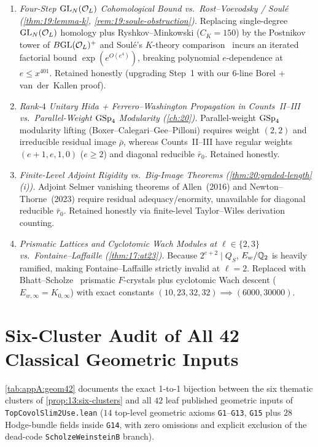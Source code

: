\begin{enumerate}[label=\textbf{F\arabic*.}]
\item \emph{Four-Step $\mathrm{GL}_N(\mathcal{O}_L)$ Cohomological Bound vs.\ Rost--Voevodsky / Soul\'e (\cref{thm:19:lemma-k}, \cref{rem:19:soule-obstruction}).}
  Replacing single-degree $\mathrm{GL}_N(\mathcal{O}_L)$ homology plus Ryshkov--Minkowski ($C_K = 150$) by the Postnikov tower of $B\mathrm{GL}(\mathcal{O}_L)^+$ and Soul\'e's $K$-theory comparison~\cite{Soule1999} incurs an iterated factorial bound $\exp(e^{O(e^4)})$, breaking polynomial $e$-dependence at $e \le x^{401}$. Retained honestly (upgrading Step~1 with our 6-line Borel + van~der~Kallen proof).

\item \emph{Rank-$4$ Unitary Hida + Ferrero--Washington Propagation in Counts~II--III vs.\ Parallel-Weight $\mathrm{GSp}_4$ Modularity (\cref{ch:20}).}
  Parallel-weight $\mathrm{GSp}_4$ modularity lifting (Boxer--Calegari--Gee--Pilloni) requires weight $(2, 2)$ and irreducible residual image $\bar{\rho}$, whereas Counts~II--III have regular weights $(e+1, e, 1, 0)$ ($e \ge 2$) and diagonal reducible $\bar{r}_0$. Retained honestly.

\item \emph{Finite-Level Adjoint Rigidity vs.\ Big-Image Theorems (\cref{thm:20:graded-length}(i)).}
  Adjoint Selmer vanishing theorems of Allen~(2016) and Newton--Thorne~(2023) require residual adequacy/enormity, unavailable for diagonal reducible $\bar{r}_0$. Retained honestly via finite-level Taylor--Wiles derivation counting.

\item \emph{Prismatic Lattices and Cyclotomic Wach Modules at $\ell \in \{2, 3\}$ vs.\ Fontaine--Laffaille (\cref{thm:17:at23}).}
  Because $2^{e+2} \mid Q_S$, $E_w/\mathbb{Q}_2$ is heavily ramified, making Fontaine--Laffaille strictly invalid at $\ell = 2$. Replaced with Bhatt--Scholze~\cite[Theorem~5.6]{BhattScholze2023} prismatic $F$-crystals plus cyclotomic Wach descent ($E_{w, \infty} = K_{0, \infty}$) with exact constants $(10, 23, 32, 32) \implies (6000, 30000)$.
\end{enumerate}

\section{Six-Cluster Audit of All 42 Classical Geometric Inputs}
\label{sec:appA:geom42}

\cref{tab:appA:geom42} documents the exact 1-to-1 bijection between the six thematic clusters of \cref{prop:13:six-clusters} and all $42$ leaf published geometric inputs of \texttt{TopCovolSlim2Use.lean} ($14$ top-level geometric axioms \texttt{G1}--\texttt{G13}, \texttt{G15} plus $28$ Hodge-bundle fields inside \texttt{G14}, with zero omissions and explicit exclusion of the dead-code \texttt{ScholzeWeinsteinB} branch).

